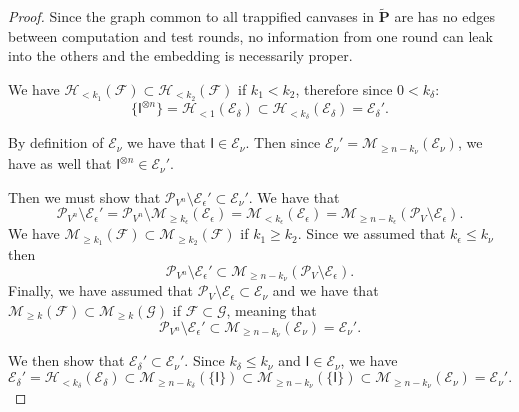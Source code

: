 \documentclass[12pt]{iopart}
\newcommand{\cptp}[1]{\mathsf{#1}} \newcommand{\pd}[1]{\mathcal{#1}}  \newcommand{\sch}[1]{\bm{#1}}
\newcommand{\Id}{\cptp{I}}
\renewcommand{\1}{\mathds{1}}
\begin{document}
\begin{proof}
Since the graph common to all trappified canvases in $\tilde{\sch P}$ are has no edges between computation and test rounds, no information from one round can leak into the others and the embedding is necessarily proper.

We have $\mathcal{H}_{< k_1}(\mathcal F) \subset \mathcal{H}_{< k_2}(\mathcal F)$ if $k_1 < k_2$, therefore since $0 < k_\delta$:
\begin{equation}
\{\Id^{\otimes n}\} = \mathcal{H}_{< 1}(\mathcal E_\delta) \subset \mathcal{H}_{< k_\delta}(\mathcal E_\delta) = \mathcal{E}_\delta'.
\end{equation}

By definition of $\mathcal{E}_\nu$ we have that $\Id \in \mathcal{E}_\nu$. Then since $\mathcal{E}_\nu' = \mathcal{M}_{\geq n - k_\nu}(\mathcal E_\nu)$, we have as well that $\Id^{\otimes n} \in \mathcal{E}_\nu'$.

Then we must show that $\mathcal P_{V^n} \setminus \mathcal E_\epsilon' \subset \mathcal E_\nu'$. We have that
\begin{equation}
\mathcal P_{V^n} \setminus \mathcal E_\epsilon' = \mathcal P_{V^n} \setminus \mathcal{M}_{\geq k_\epsilon}(\mathcal E_\epsilon) = \mathcal{M}_{< k_\epsilon}(\mathcal E_\epsilon) = \mathcal{M}_{\geq n - k_\epsilon}(\mathcal{P}_V \setminus \mathcal E_\epsilon).
\end{equation}
We have $\mathcal{M}_{\geq k_1}(\mathcal F) \subset \mathcal{M}_{\geq k_2}(\mathcal F)$ if $k_1 \geq k_2$. Since we assumed that $k_\epsilon \leq  k_\nu$ then
\begin{equation}
\mathcal P_{V^n} \setminus \mathcal E_\epsilon' \subset \mathcal{M}_{\geq n - k_\nu}(\mathcal{P}_V \setminus \mathcal E_\epsilon).
\end{equation}
Finally, we have assumed that $\mathcal{P}_V \setminus \mathcal E_\epsilon \subset \mathcal E_\nu$ and we have that $\mathcal{M}_{\geq k}(\mathcal F) \subset \mathcal{M}_{\geq k}(\mathcal G)$ if $\mathcal{F} \subset \mathcal{G}$, meaning that
\begin{equation}
\mathcal P_{V^n} \setminus \mathcal E_\epsilon' \subset \mathcal{M}_{\geq n - k_\nu}(\mathcal E_\nu) = \mathcal E_\nu'.
\end{equation}

We then show that $\mathcal{E}_\delta' \subset \mathcal{E}_\nu'$. Since $k_\delta \leq k_\nu$ and $\Id \in \mathcal E_\nu$, we have
\begin{equation}
\mathcal{E}_\delta' = \mathcal{H}_{< k_\delta}(\mathcal E_\delta) \subset \mathcal{M}_{\geq n - k_\delta}(\{\Id\}) \subset \mathcal{M}_{\geq n - k_\nu}(\{\Id\}) \subset \mathcal{M}_{\geq n - k_\nu}(\mathcal E_\nu) = \mathcal E_\nu'.
\end{equation}


\end{proof}
\end{document}
